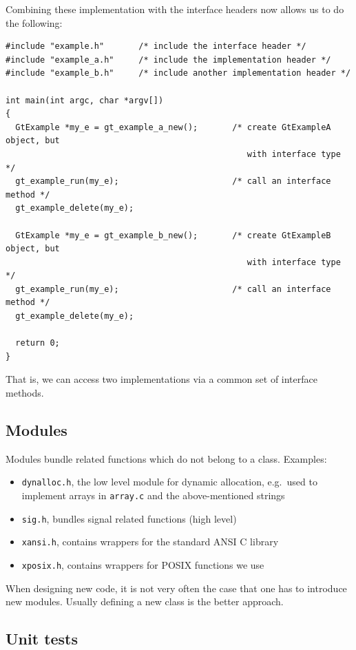 \documentclass[11pt,final]{article}
\newcommand{\keyword}[1]{\lstinline{#1}}
\begin{document}
Combining these implementation with the interface headers now allows us to do
the following:

\begin{lstlisting}
#include "example.h"       /* include the interface header */
#include "example_a.h"     /* include the implementation header */
#include "example_b.h"     /* include another implementation header */

int main(int argc, char *argv[])
{
  GtExample *my_e = gt_example_a_new();       /* create GtExampleA object, but
                                                 with interface type */
  gt_example_run(my_e);                       /* call an interface method */
  gt_example_delete(my_e);

  GtExample *my_e = gt_example_b_new();       /* create GtExampleB object, but
                                                 with interface type */
  gt_example_run(my_e);                       /* call an interface method */
  gt_example_delete(my_e);

  return 0;
}
\end{lstlisting}

That is, we can access two implementations via a common set of interface
methods.

\subsection{Modules}

Modules bundle related functions which do not belong to a class. Examples:
\begin{itemize}
\item
\keyword{dynalloc.h}, the low level module for dynamic allocation,
e.g.\ used to implement arrays in \keyword{array.c} and the
above-mentioned strings
\item
\keyword{sig.h}, bundles signal related functions (high level)
\item
\keyword{xansi.h}, contains wrappers for the standard ANSI C library
\item
\keyword{xposix.h}, contains wrappers for POSIX functions we use
\end{itemize}

When designing new code, it is not very often the case that one has to introduce
new modules. Usually defining a new class is the better approach.

\subsection{Unit tests}
\end{document}
